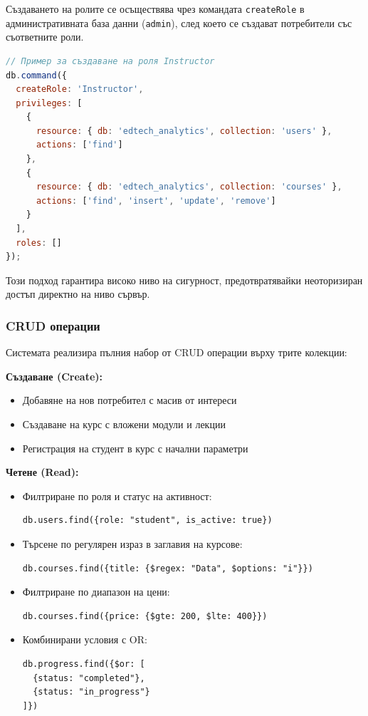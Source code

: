 Създаването на ролите се осъществява чрез командата \texttt{createRole} в административната база данни (\texttt{admin}), след което се създават потребители със съответните роли.

\begin{lstlisting}[language=JavaScript,caption=Създаване на потребителски роли и присвояване на привилегии]
// Пример за създаване на роля Instructor
db.command({
  createRole: 'Instructor',
  privileges: [
    { 
      resource: { db: 'edtech_analytics', collection: 'users' }, 
      actions: ['find']
    },
    {
      resource: { db: 'edtech_analytics', collection: 'courses' }, 
      actions: ['find', 'insert', 'update', 'remove']
    }
  ],
  roles: []
});
\end{lstlisting}

Този подход гарантира високо ниво на сигурност, предотвратявайки неоторизиран достъп директно на ниво сървър.

\subsubsection{CRUD операции}

Системата реализира пълния набор от CRUD операции върху трите колекции:

\textbf{Създаване (Create):}
\begin{itemize}
    \item Добавяне на нов потребител с масив от интереси
    \item Създаване на курс с вложени модули и лекции
    \item Регистрация на студент в курс с начални параметри
\end{itemize}

\textbf{Четене (Read):}
\begin{itemize}
\item Филтриране по роля и статус на активност:
\begin{lstlisting}
db.users.find({role: "student", is_active: true})
\end{lstlisting}
\item Търсене по регулярен израз в заглавия на курсове: 
\begin{lstlisting}
db.courses.find({title: {$regex: "Data", $options: "i"}})
\end{lstlisting}
\item Филтриране по диапазон на цени: 
\begin{lstlisting}
db.courses.find({price: {$gte: 200, $lte: 400}})
\end{lstlisting}
\item Комбинирани условия с OR:
\begin{lstlisting}
db.progress.find({$or: [
  {status: "completed"}, 
  {status: "in_progress"}
]})
\end{lstlisting}
\end{itemize}

